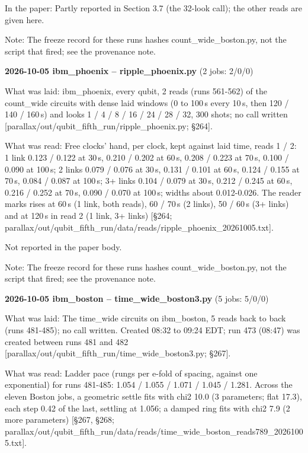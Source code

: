 \documentclass[11pt]{article}
\begin{document}
In the paper: Partly reported in Section 3.7 (the 32-look call); the other reads are given here.

Note: The freeze record for these runs hashes count\_wide\_boston.py, not the script that fired; see the provenance note.

\textbf{2026-10-05 ibm\_phoenix -- ripple\_phoenix.py} (2 jobs: 2/0/0)

What was laid: ibm\_phoenix, every qubit, 2 reads (runs 561-562) of the count\_wide circuits with dense laid windows (0 to 100\,\textmu s every 10\,\textmu s, then 120 / 140 / 160\,\textmu s) and looks 1 / 4 / 8 / 16 / 24 / 28 / 32, 300 shots; no call written {[}parallax/out/qubit\_fifth\_run/ripple\_phoenix.py; \S{}264{]}.

What was read: Free clocks' hand, per clock, kept against laid time, reads 1 / 2: 1 link 0.123 / 0.122 at 30\,\textmu s, 0.210 / 0.202 at 60\,\textmu s, 0.208 / 0.223 at 70\,\textmu s, 0.100 / 0.090 at 100\,\textmu s; 2 links 0.079 / 0.076 at 30\,\textmu s, 0.131 / 0.101 at 60\,\textmu s, 0.124 / 0.155 at 70\,\textmu s, 0.084 / 0.087 at 100\,\textmu s; 3+ links 0.104 / 0.079 at 30\,\textmu s, 0.212 / 0.245 at 60\,\textmu s, 0.216 / 0.252 at 70\,\textmu s, 0.090 / 0.070 at 100\,\textmu s; widths about 0.012-0.026. The reader marks rises at 60\,\textmu s (1 link, both reads), 60 / 70\,\textmu s (2 links), 50 / 60\,\textmu s (3+ links) and at 120\,\textmu s in read 2 (1 link, 3+ links) {[}\S{}264; parallax/out/qubit\_fifth\_run/data/reads/ripple\_phoenix\_20261005.txt{]}.

Not reported in the paper body.

Note: The freeze record for these runs hashes count\_wide\_boston.py, not the script that fired; see the provenance note.

\textbf{2026-10-05 ibm\_boston -- time\_wide\_boston3.py} (5 jobs: 5/0/0)

What was laid: The time\_wide circuits on ibm\_boston, 5 reads back to back (runs 481-485); no call written. Created 08:32 to 09:24 EDT; run 473 (08:47) was created between runs 481 and 482 {[}parallax/out/qubit\_fifth\_run/time\_wide\_boston3.py; \S{}267{]}.

What was read: Ladder pace (rungs per e-fold of spacing, against one exponential) for runs 481-485: 1.054 / 1.055 / 1.071 / 1.045 / 1.281. Across the eleven Boston jobs, a geometric settle fits with chi2 10.0 (3 parameters; flat 17.3), each step 0.42 of the last, settling at 1.056; a damped ring fits with chi2 7.9 (2 more parameters) {[}\S{}267, \S{}268; parallax/out/qubit\_fifth\_run/data/reads/time\_wide\_boston\_reads789\_20261005.txt{]}.
\end{document}
